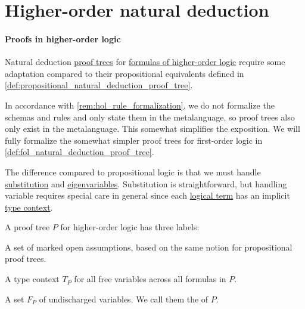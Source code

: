 \section{Higher-order natural deduction}\label{sec:higher_order_natural_deduction}

\paragraph{Proofs in higher-order logic}

\begin{definition}\label{def:hol_natural_deduction_proof_tree}\mimprovised
  Natural deduction \hyperref[def:proof_tree]{proof trees} for \hyperref[def:hol_expression/formula]{formulas of higher-order logic} require some adaptation compared to their propositional equivalents defined in \cref{def:propositional_natural_deduction_proof_tree}.

  In accordance with \cref{rem:hol_rule_formalization}, we do not formalize the schemas and rules and only state them in the metalanguage, so proof trees also only exist in the metalanguage. This somewhat simplifies the exposition. We will fully formalize the somewhat simpler proof trees for first-order logic in \cref{def:fol_natural_deduction_proof_tree}.

  The difference compared to propositional logic is that we must handle \hyperref[alg:lambda_term_substitution]{substitution} and \hyperref[def:fol_natural_deduction_proof_tree/eigenvariables]{eigenvariables}. Substitution is straightforward, but handling variable requires special care in general since each \hyperref[def:hol_expression]{logical term} has an implicit \hyperref[def:type_context]{type context}.

  A proof tree \( P \) for higher-order logic has three labels:

  \begin{thmenum}[series=def:hol_natural_deduction_proof_tree]
     A set of marked open assumptions, based on the same notion for propositional proof trees.

     A type context \( T_P \) for all free variables across all formulas in \( P \).

     A set \( F_P \) of undischarged  variables. We call them the  of \( P \).
  \end{thmenum}


\end{definition}
